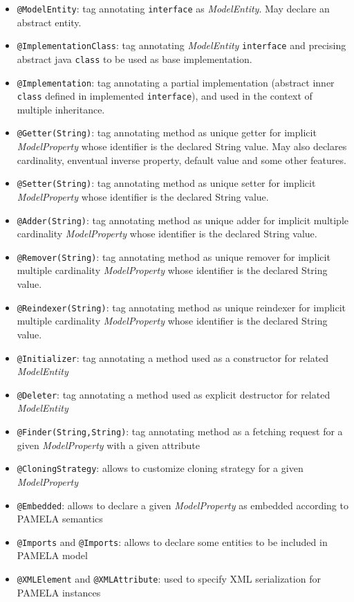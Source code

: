 \begin{itemize}
    \item \texttt{@ModelEntity}: tag annotating \texttt{interface} as \emph{ModelEntity}. May declare an abstract entity.
    \item \texttt{@ImplementationClass}: tag annotating \emph{ModelEntity} \texttt{interface} and precising abstract java \texttt{class} to be used as base implementation.
    \item \texttt{@Implementation}: tag annotating a partial implementation (abstract inner \texttt{class} defined in implemented \texttt{interface}), and used in the context of multiple inheritance.
    \item \texttt{@Getter(String)}: tag annotating method as unique getter for implicit \emph{ModelProperty} whose identifier is the declared String value. May also declares cardinality, enventual inverse property, default value and some other features.
    \item \texttt{@Setter(String)}: tag annotating method as unique setter for implicit \emph{ModelProperty} whose identifier is the declared String value.
    \item \texttt{@Adder(String)}: tag annotating method as unique adder for implicit multiple cardinality \emph{ModelProperty} whose identifier is the declared String value.
    \item \texttt{@Remover(String)}: tag annotating method as unique remover for implicit multiple cardinality \emph{ModelProperty} whose identifier is the declared String value.
    \item \texttt{@Reindexer(String)}: tag annotating method as unique reindexer for implicit multiple cardinality \emph{ModelProperty} whose identifier is the declared String value.
    \item \texttt{@Initializer}: tag annotating a method used as a constructor for related \emph{ModelEntity}
   \item \texttt{@Deleter}: tag annotating a method used as explicit destructor for related \emph{ModelEntity}
    \item \texttt{@Finder(String,String)}: tag annotating method as a fetching request for a given \emph{ModelProperty} with a given attribute
    \item \texttt{@CloningStrategy}: allows to customize cloning strategy for a given \emph{ModelProperty}
    \item \texttt{@Embedded}: allows to declare a given \emph{ModelProperty} as embedded according to PAMELA semantics
    \item \texttt{@Imports} and \texttt{@Imports}: allows to declare some entities to be included in PAMELA model
    \item \texttt{@XMLElement} and \texttt{@XMLAttribute}: used to specify XML serialization for PAMELA instances
    
\end{itemize}

